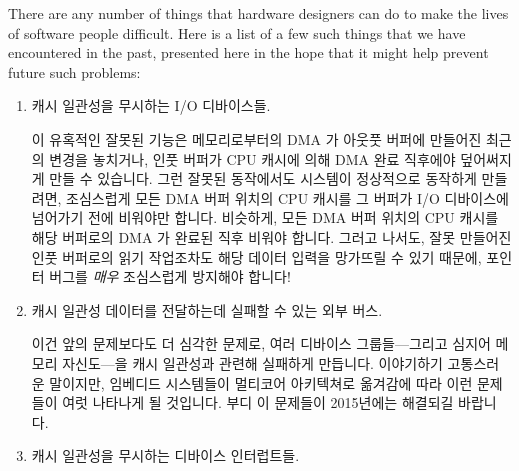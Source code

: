 There are any number of things that hardware designers can do
to make the lives of software people difficult.
Here is a list of a few such things that we have encountered in
the past, presented here in the hope that it might help prevent
future such problems:
\fi
\begin{enumerate}
\item	캐시 일관성을 무시하는 I/O 디바이스들.

	이 유혹적인 잘못된 기능은 메모리로부터의 DMA 가 아웃풋 버퍼에 만들어진
	최근의 변경을 놓치거나, 인풋 버퍼가 CPU 캐시에 의해 DMA 완료 직후에야
	덮어써지게 만들 수 있습니다.
	그런 잘못된 동작에서도 시스템이 정상적으로 동작하게 만들려면,
	조심스럽게 모든 DMA 버퍼 위치의 CPU 캐시를 그 버퍼가 I/O 디바이스에
	넘어가기 전에 비워야만 합니다.
	비슷하게, 모든 DMA 버퍼 위치의 CPU 캐시를 해당 버퍼로의 DMA 가 완료된
	직후 비워야 합니다.
	그러고 나서도, 잘못 만들어진 인풋 버퍼로의 읽기 작업조차도 해당 데이터
	입력을 망가뜨릴 수 있기 때문에, 포인터 버그를 \emph{매우} 조심스럽게
	방지해야 합니다!

\item	캐시 일관성 데이터를 전달하는데 실패할 수 있는 외부 버스.

	이건 앞의 문제보다도 더 심각한 문제로, 여러 디바이스 그룹들---그리고
	심지어 메모리 자신도---을 캐시 일관성과 관련해 실패하게 만듭니다.
	이야기하기 고통스러운 말이지만, 임베디드 시스템들이 멀티코어 아키텍쳐로
	옮겨감에 따라 이런 문제들이 여럿 나타나게 될 것입니다.
	부디 이 문제들이 2015년에는 해결되길 바랍니다.

\item	캐시 일관성을 무시하는 디바이스 인터럽트들.


\end{enumerate}
